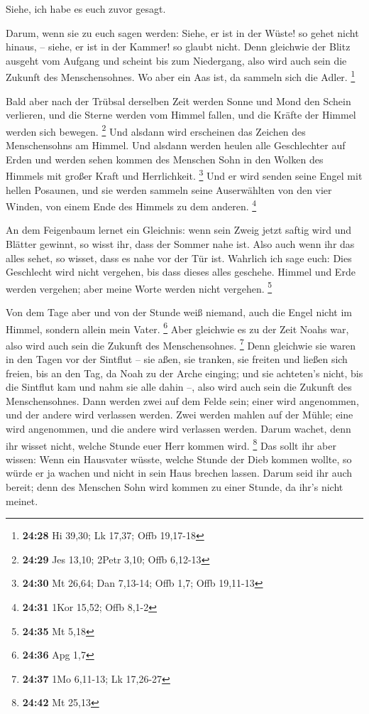  Siehe, ich habe es euch zuvor gesagt.

 Darum, wenn sie zu euch sagen werden: Siehe, er ist in der
Wüste! so gehet nicht hinaus, -- siehe, er ist in der Kammer! so glaubt
nicht.  Denn gleichwie der Blitz ausgeht vom Aufgang und
scheint bis zum Niedergang, also wird auch sein die Zukunft des
Menschensohnes.  Wo aber ein Aas ist, da sammeln sich die
Adler. \footnote{\textbf{24:28} Hi 39,30; Lk 17,37; Offb 19,17-18}

 Bald aber nach der Trübsal derselben Zeit werden Sonne und
Mond den Schein verlieren, und die Sterne werden vom Himmel fallen, und
die Kräfte der Himmel werden sich bewegen. \footnote{\textbf{24:29} Jes
  13,10; 2Petr 3,10; Offb 6,12-13}  Und alsdann wird
erscheinen das Zeichen des Menschensohns am Himmel. Und alsdann werden
heulen alle Geschlechter auf Erden und werden sehen kommen des Menschen
Sohn in den Wolken des Himmels mit großer Kraft und Herrlichkeit.
\footnote{\textbf{24:30} Mt 26,64; Dan 7,13-14; Offb 1,7; Offb 19,11-13}
 Und er wird senden seine Engel mit hellen Posaunen, und
sie werden sammeln seine Auserwählten von den vier Winden, von einem
Ende des Himmels zu dem anderen. \footnote{\textbf{24:31} 1Kor 15,52;
  Offb 8,1-2}

 An dem Feigenbaum lernet ein Gleichnis: wenn sein Zweig
jetzt saftig wird und Blätter gewinnt, so wisst ihr, dass der Sommer
nahe ist.  Also auch wenn ihr das alles sehet, so wisset,
dass es nahe vor der Tür ist.  Wahrlich ich sage euch: Dies
Geschlecht wird nicht vergehen, bis dass dieses alles geschehe.
 Himmel und Erde werden vergehen; aber meine Worte werden
nicht vergehen. \footnote{\textbf{24:35} Mt 5,18}

 Von dem Tage aber und von der Stunde weiß niemand, auch
die Engel nicht im Himmel, sondern allein mein Vater. \footnote{\textbf{24:36}
  Apg 1,7}  Aber gleichwie es zu der Zeit Noahs war, also
wird auch sein die Zukunft des Menschensohnes. \footnote{\textbf{24:37}
  1Mo 6,11-13; Lk 17,26-27}  Denn gleichwie sie waren in
den Tagen vor der Sintflut -- sie aßen, sie tranken, sie freiten und
ließen sich freien, bis an den Tag, da Noah zu der Arche einging;
 und sie achteten's nicht, bis die Sintflut kam und nahm
sie alle dahin --, also wird auch sein die Zukunft des Menschensohnes.
 Dann werden zwei auf dem Felde sein; einer wird
angenommen, und der andere wird verlassen werden.  Zwei
werden mahlen auf der Mühle; eine wird angenommen, und die andere wird
verlassen werden.  Darum wachet, denn ihr wisset nicht,
welche Stunde euer Herr kommen wird. \footnote{\textbf{24:42} Mt 25,13}
 Das sollt ihr aber wissen: Wenn ein Hausvater wüsste,
welche Stunde der Dieb kommen wollte, so würde er ja wachen und nicht in
sein Haus brechen lassen.  Darum seid ihr auch bereit; denn
des Menschen Sohn wird kommen zu einer Stunde, da ihr's nicht meinet.

